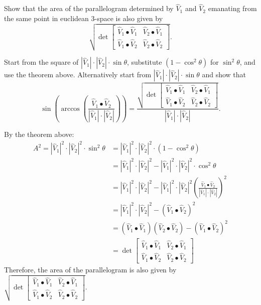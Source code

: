 \documentclass{ximera}
\begin{document}
\begin{problem}
\label{9}Show that the area of the parallelogram determined by $\hat{V}_{1}$
and $\hat{V}_{2}$ emanating from the same point in euclidean $3$-space is also
given by%
\[
\sqrt{\det
\begin{bmatrix}
\hat{V}_{1}\bullet\hat{V}_{1} & \hat{V}_{2}\bullet\hat{V}_{1}\\
\hat{V}_{1}\bullet\hat{V}_{2} & \hat{V}_{2}\bullet\hat{V}_{2}%
\end{bmatrix}}.
\]

\begin{hint}
Start from the square of
$|\hat{V}_{1}|\cdot|\hat{V}_{2}|\cdot\sin\theta$, substitute $\left(
1-\cos^{2}\theta\right)$ for $\sin^{2}\theta$, and use the theorem
above. Alternatively start from
$|\hat{V}_{1}|\cdot|\hat{V}_{2}|\cdot\sin\theta$ and show that%
\[
\sin\left(  \arccos\left(  \frac{\hat{V}_{1}\bullet\hat{V}%
_{2}}{\left\vert \hat{V}_{1}\right\vert \cdot\left\vert \hat{V}_{2}\right\vert
}\right)  \right)  
=\frac{\sqrt{\det
    \begin{bmatrix}
      \hat{V}_{1}\bullet\hat{V}_{1} & \hat{V}_{2}\bullet\hat{V}_{1}\\
      \hat{V}_{1}\bullet\hat{V}_{2} & \hat{V}_{2}\bullet\hat{V}_{2}
    \end{bmatrix}
  }
}{\left\vert\hat{V}_{1}\right\vert \cdot\left\vert
  \hat{V}_{2}\right\vert }.
\]
\end{hint}

\begin{freeResponse}
By the theorem above:
\begin{align*}
A^2 = |\hat{V}_{1}|^2 \cdot |\hat{V}_{2} |^2 \cdot\sin^{2}\theta 
&= |\hat{V}_{1}|^2 \cdot |\hat{V}_{2} |^2 \cdot \left(1- \cos^{2}\theta\right)\\
&= |\hat{V}_{1}|^2 \cdot |\hat{V}_{2} |^2 - |\hat{V}_{1}|^2 \cdot |\hat{V}_{2} |^2 \cdot\cos^{2}\theta \\
&= |\hat{V}_{1}|^2 \cdot |\hat{V}_{2} |^2 - |\hat{V}_{1}|^2 \cdot |\hat{V}_{2} |^2 \left(  \frac{\hat{V}_{1}\bullet\hat{V}_{2}}{\left\vert \hat{V}_{1}\right\vert \cdot\left\vert \hat{V}_{2}\right\vert}\right)^2\\
&= |\hat{V}_{1}|^2 \cdot |\hat{V}_{2} |^2 - \left(\hat{V}_{1}\bullet\hat{V}_{2}\right)^2\\
&= \left(\hat{V}_{1}\bullet\hat{V}_{1}\right) \left(\hat{V}_{2}\bullet\hat{V}_{2}\right) - \left(\hat{V}_{1}\bullet\hat{V}_{2}\right)^2\\
&=\det
    \begin{bmatrix}
      \hat{V}_{1}\bullet\hat{V}_{1} & \hat{V}_{2}\bullet\hat{V}_{1}\\
      \hat{V}_{1}\bullet\hat{V}_{2} & \hat{V}_{2}\bullet\hat{V}_{2}
    \end{bmatrix}
\end{align*}
Therefore, the area of the parallelogram is also given by
$\sqrt{\det
    \begin{bmatrix}
      \hat{V}_{1}\bullet\hat{V}_{1} & \hat{V}_{2}\bullet\hat{V}_{1}\\
      \hat{V}_{1}\bullet\hat{V}_{2} & \hat{V}_{2}\bullet\hat{V}_{2}
    \end{bmatrix}}$.


\end{freeResponse}
\end{problem}
\end{document}
